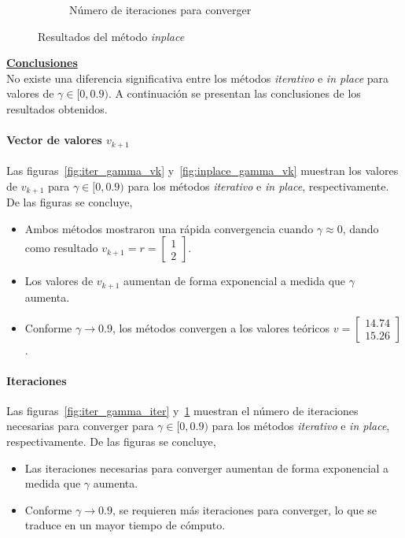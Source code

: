 \begin{figure}[H]
\begin{subfigure}[H]{0.45\textwidth}
        \caption{Número de iteraciones para converger}
        \label{fig:inplace_gamma_iter}
    \end{subfigure}
    \caption{Resultados del método \textit{inplace}}\label{fig:inplace_gamma}
\end{figure}


\indent\underline{\textbf{Conclusiones}}\\
No existe una diferencia significativa entre los métodos \textit{iterativo} e \textit{in place} para valores de $\gamma \in [0, 0.9)$.
A continuación se presentan las conclusiones de los resultados obtenidos.

\paragraph{Vector de valores $v_{k+1}$}
Las figuras~\ref{fig:iter_gamma_vk} y~\ref{fig:inplace_gamma_vk} muestran los valores de $v_{k+1}$ para $\gamma \in [0, 0.9)$ para los métodos \textit{iterativo} e \textit{in place}, respectivamente.
De las figuras se concluye,

\begin{itemize}
    \item Ambos métodos mostraron una rápida convergencia cuando $\gamma \approx 0$, dando como resultado $v_{k+1} = r = \begin{bmatrix} 1 \\ 2 \end{bmatrix}$.
    \item Los valores de $v_{k+1}$ aumentan de forma exponencial a medida que $\gamma$ aumenta.
    \item Conforme $\gamma \rightarrow 0.9$, los métodos convergen a los valores teóricos $v = \begin{bmatrix} 14.74 \\ 15.26 \end{bmatrix}$.
\end{itemize}

\paragraph{Iteraciones}
Las figuras~\ref{fig:iter_gamma_iter} y~\ref{fig:inplace_gamma_iter} muestran el número de iteraciones necesarias para converger para $\gamma \in [0, 0.9)$ para los métodos \textit{iterativo} e \textit{in place}, respectivamente.
De las figuras se concluye,

\begin{itemize}
    \item Las iteraciones necesarias para converger aumentan de forma exponencial a medida que $\gamma$ aumenta.
    \item Conforme $\gamma \rightarrow 0.9$, se requieren más iteraciones para converger, lo que se traduce en un mayor tiempo de cómputo.
\end{itemize}

